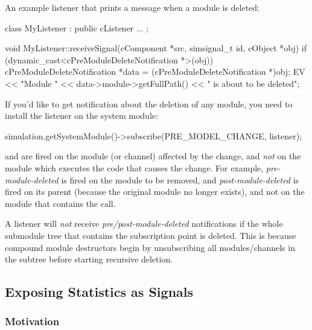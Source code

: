 An example listener that prints a message when a module is deleted:

\begin{cpp}
class MyListener : public cListener
{
   ...
};

void MyListener::receiveSignal(cComponent *src, simsignal_t id, cObject *obj)
{
    if (dynamic_cast<cPreModuleDeleteNotification *>(obj))
    {
        cPreModuleDeleteNotification *data = (cPreModuleDeleteNotification *)obj;
        EV << "Module " << data->module->getFullPath() << " is about to be deleted\n";
    }
}
\end{cpp}

If you'd like to get notification about the deletion of any module, you need
to install the listener on the system module:

\begin{cpp}
simulation.getSystemModule()->subscribe(PRE_MODEL_CHANGE, listener);
\end{cpp}

\begin{note}
   and  are fired on the
  module (or channel) affected by the change, and \textit{not} on the module
  which executes the code that causes the change. For example,
  \textit{pre-module-deleted} is fired on the module to be removed, and
  \textit{post-module-deleted} is fired on its parent (because the original
  module no longer exists), and not on the module that contains the
   call.
\end{note}

\begin{note}
  A listener will \textit{not} receive \textit{pre/post-module-deleted}
  notifications if the whole submodule tree that contains the subscription
  point is deleted. This is because compound module destructors begin
  by unsubscribing all modules/channels in the subtree before starting
  recursive deletion.
\end{note}


\subsection{Exposing Statistics as Signals}
\label{sec:ch-simple-modules:statistic-signals}

\subsubsection{Motivation}

